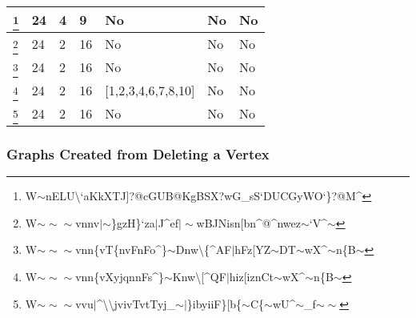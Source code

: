 \documentclass[12pt]{article}
\theoremstyle{parenbold}
\begin{document}
\begin{center}
\begin{minipage}{\textwidth}
\begin{tabular}{ |p{1cm}|p{1.5cm}|p{0.5cm}|p{1.5cm}|p{2.7cm}|p{2cm}|p{1cm}|}
 \hline
 \footnote{W$\sim$nELU\textbackslash{}`aKkXTJ]?@cGUB@KgBSX?wG\_sS`DUCGyWO`\}?@M\^{}\label{graph15}} & 24 & 4 & 9 & No & No & No\\
 \hline
 \footnote{W$\sim\sim\sim$vnnv$\vert$$\sim$\}gzH\}`za$\vert$J\^{}ef$\vert\sim$wBJNisn[bn\^{}@\^{}nwez$\sim$`V\^{}$\sim$\label{graph16}} & 24 & 2 & 16 & No & No & No\\
 \hline
 \footnote{W$\sim\sim\sim$vnn\{vT\{nvFnFo\^{}\}$\sim$Dnw\textbackslash{}\{\^{}AF$\vert$hFz[YZ$\sim$DT$\sim$wX\^{}$\sim$n\{B$\sim$\label{graph17}} & 24 & 2 & 16 & No & No & No\\
 \hline
 \footnote{W$\sim\sim\sim$vnn\{vXyjqnnFs\^{}\}$\sim$Knw\textbackslash{}[\^{}QF$\vert$hiz[iznCt$\sim$wX\^{}$\sim$n\{B$\sim$\label{graph18}} & 24 & 2 & 16 & [1,2,3,4,6,7,8,10] & No & No\\
 \hline
 \footnote{W$\sim\sim\sim$vvu$\vert$\^{}\textbackslash{}\textbackslash{}jvivTvtTyj\_$\sim\vert$\}ibyiiF\}[b\{$\sim$C\{$\sim$wU\^{}$\sim$\_f$\sim\sim$\label{graph19}} & 24 & 2 & 16 & No & No & No\\
 \hline
\end{tabular}
\end{minipage}
\end{center}

\subsubsection{Graphs Created from Deleting a Vertex}
\end{document}
